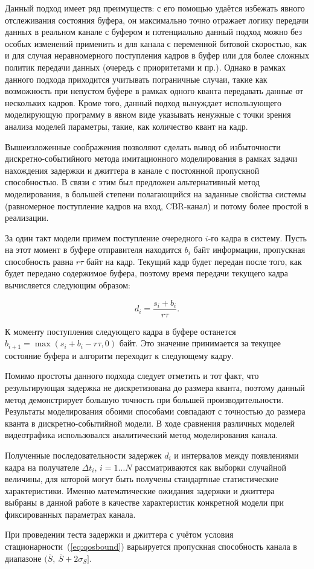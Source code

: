 Данный подход имеет ряд преимуществ: с его помощью удаётся
избежать явного отслеживания состояния буфера,
он максимально точно отражает логику передачи данных в реальном
канале с буфером и потенциально данный подход можно
без особых изменений применить и для канала с переменной
битовой скоростью, как и для случая неравномерного поступления
кадров в буфер или для более сложных политик передачи данных
(очередь с приоритетами и пр.). Однако в рамках данного подхода приходится
учитывать пограничные случаи, такие как возможность при
непустом буфере в рамках одного кванта передавать
данные от нескольких кадров. Кроме того, данный подход вынуждает
использующего моделирующую программу в явном виде указывать
ненужные с точки зрения анализа моделей параметры, такие,
как количество квант на кадр.

Вышеизложенные соображения позволяют сделать вывод об
избыточности дискретно-событийного метода имитационного
моделирования в рамках задачи нахождения задержки
и джиттера в канале с постоянной пропускной способностью.
В связи с этим был предложен альтернативный метод
моделирования, в большей степени полагающийся на
заданные свойства системы (равномерное поступление
кадров на вход, CBR-канал) и потому более простой
в реализации.

За один такт модели примем поступление очередного
$i$-го кадра в систему. Пусть на этот момент в
буфере отправителя находится $b_i$ байт информации,
пропускная способность равна $r\tau$ байт на кадр.
Текущий кадр будет передан после того, как будет
передано содержимое буфера, поэтому время передачи
текущего кадра вычисляется следующим образом:

\begin{equation}
    d_i = \frac{s_i + b_i}{r\tau}.
\end{equation}

К моменту поступления следующего кадра в буфере
останется $b_{i+1} = \max(s_i + b_i - r\tau, 0)$
байт. Это значение принимается за текущее состояние
буфера и алгоритм переходит к следующему кадру.

Помимо простоты данного подхода следует отметить и
тот факт, что результирующая задержка не дискретизована
до размера кванта, поэтому данный метод демонстрирует
большую точность при большей производительности.
Результаты моделирования обоими способами совпадают
с точностью до размера кванта в дискретно-событийной модели.
В ходе сравнения различных моделей видеотрафика использовался
аналитический метод моделирования канала.

Полученные последовательности задержек $d_i$ и интервалов
между появлениями кадра на получателе $\Delta t_i$, $i = 1 \dots N$
рассматриваются как выборки случайной величины, для которой
могут быть получены стандартные статистические характеристики.
Именно математические ожидания задержки и джиттера выбраны
в данной работе в качестве характеристик
конкретной модели при фиксированных параметрах канала.

При проведении теста задержки и джиттера с учётом условия стационарности~(\ref{eq:qosbound})
варьируется пропускная способность канала в диапазоне $(\overline{S},~\overline{S} + 2\sigma_S]$.

